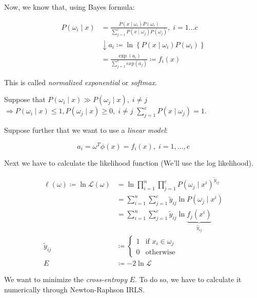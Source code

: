 
Now, we know that, using Bayes formula:

\begin{align*}
  P(\omega_i \mid x) &= \frac{P(x \mid \omega_i)P(\omega_i)}{\sum_{j=1}^c P(x \mid \omega_j)P(\omega_j)}, \; i=1 \dots c \\
                & \downarrow  a_i \coloneqq \ln \left\{ P(x \mid \omega_i)P(\omega_i) \right\} \\
                &= \frac{\exp(a_i)}{\sum_{j=1}^c exp(a_j)} \coloneqq f_i(x)
\end{align*}

This is called \emph{normalized exponential} or \emph{softmax}.

Suppose that $P(\omega_i \mid x) \gg P(\omega_j  \mid x), \; i \neq j$
$\Rightarrow P(\omega_i \mid x) \leq 1, P(\omega_j \mid x) \geq 0, \; i \neq j$
$\sum_{j=1}^c P(x \mid \omega_j) = 1$.

Suppose further that we want to use a \emph{linear model}:

\begin{equation*}
  a_i = \omega^T \phi(x) = f_i(x), \; i = 1, \dots, c
\end{equation*}

%

Next we have to calculate the likelihood function (We'll use the log likelihood).

\begin{align*}
  \ell(\omega) \coloneqq \ln\mathcal{L}(\omega) &= \ln
  \prod_{i=1}^n \prod_{j=1}^c P\left(\omega_j \mid x^i\right)^{\tilde{y}_{ij}} \\
  &= \sum_{i=1}^n \sum_{j=1}^c \tilde{y}_{ij} \ln P(\omega_j \mid x^i) \\
  &= \sum_{i=1}^n \sum_{j=1}^c \tilde{y}_{ij} \ln \underbrace{f_j(x^i)}_{\hat{y}_{ij}} \\[1em]
  \tilde{y}_{ij} &\coloneqq \begin{cases}
    1 & \text{if } x_i \in \omega_j \\
    0 & \text{otherwise}
  \end{cases} \\
    E &\coloneqq -2\ln \mathcal{L} \tag{Error function / cross-entropy}
\end{align*}

We want to minimize the \emph{cross-entropy} $E$. To do so, we have to
calculate it numerically through Newton-Raphson \textrightarrow{} IRLS.

